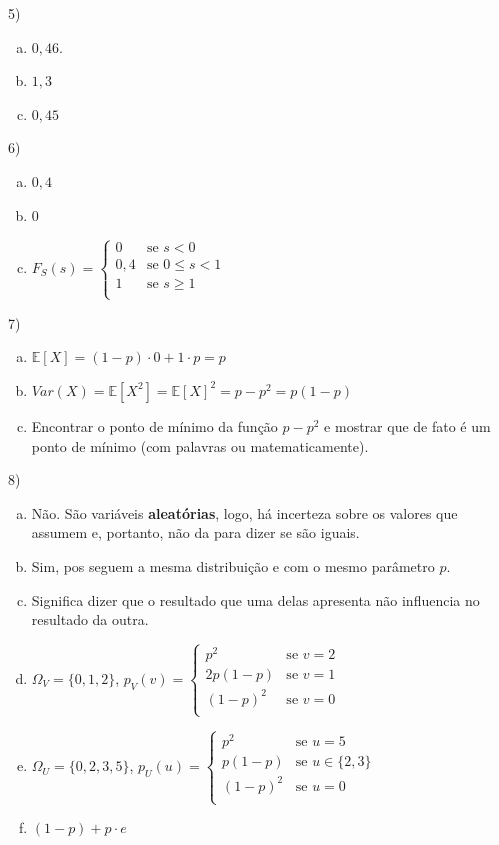 \documentclass[12pt]{article}
\begin{document}
5) 

\begin{enumerate}[(a)]
    \item $0,46$.
    \item $1,3$
    \item $0,45$
\end{enumerate}

6) 
\begin{enumerate}[(a)]
    \item $0,4$
    \item $0$
    \item $F_S(s) = \begin{cases}
        0 & \text{se }  s<0\\
        0,4 & \text{se } 0 \leq s<1\\
        1 & \text{se } s \geq 1\\
    \end{cases}$
\end{enumerate}

7) 
\begin{enumerate}[(a)]
    \item  $\mathds{E}[X] = (1-p) \cdot 0 + 1\cdot p = p$
    \item $Var(X) = \mathds{E}[X^2] = \mathds{E}[X]^2 = p - p^2 = p(1-p)$
    \item Encontrar o ponto de mínimo da função $p - p^2$ e mostrar que de fato é um ponto de mínimo (com palavras ou matematicamente).
\end{enumerate}

8) 
\begin{enumerate}[a)]
    \item Não. São variáveis \textbf{aleatórias}, logo, há incerteza sobre os valores que assumem e, portanto, não da para dizer se são iguais.
    \item Sim, pos seguem a mesma distribuição e com o mesmo parâmetro $p$. 
    \item Significa dizer que o resultado que uma delas apresenta não influencia no resultado da outra. 
    \item $\Omega_V = \{0,1,2\}$, $p_V(v) = \begin{cases}
        p^2 &\text{se } v=2\\
        2p(1-p) &\text{se } v=1\\
        (1-p)^2 &\text{se } v=0\\
    \end{cases}$
    \item $\Omega_U = \{0,2,3,5\}$, $p_U(u) = \begin{cases}
        p^2 &\text{se } u=5\\
        p(1-p) &\text{se } u \in \{2, 3\}\\
        (1-p)^2 &\text{se } u=0\\
    \end{cases}$
    \item $(1-p) + p\cdot e$
\end{enumerate}
\end{document}
